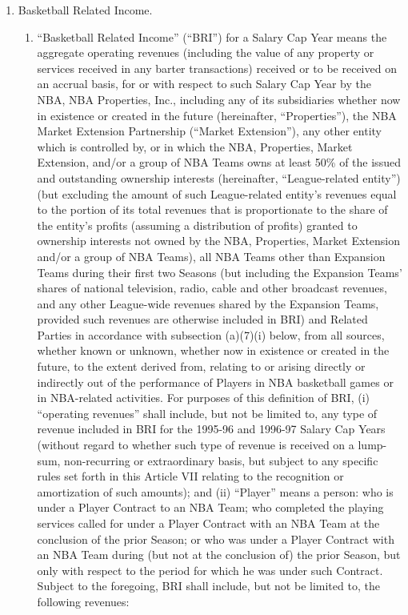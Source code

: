 \documentclass[
]{book}
\providecommand{\tightlist}{%
  \setlength{\itemsep}{0pt}\setlength{\parskip}{0pt}}
\begin{document}
\begin{enumerate}
\def\labelenumi{(\alph{enumi})}
\tightlist
\item
  Basketball Related Income.

  \begin{enumerate}
  \def\labelenumii{(\arabic{enumii})}
  \tightlist
  \item
    ``Basketball Related Income'' (``BRI'') for a Salary Cap Year means the aggregate operating revenues (including the value of any property or services received in any barter transactions) received or to be received on an accrual basis, for or with respect to such Salary Cap Year by the NBA, NBA Properties, Inc., including any of its subsidiaries whether now in existence or created in the future (hereinafter, ``Properties''), the NBA Market Extension Partnership (``Market Extension''), any other entity which is controlled by, or in which the NBA, Properties, Market Extension, and/or a group of NBA Teams owns at least 50\% of the issued and outstanding ownership interests (hereinafter, ``League-related entity'') (but excluding the amount of such League-related entity's revenues equal to the portion of its total revenues that is proportionate to the share of the entity's profits (assuming a distribution of profits) granted to ownership interests not owned by the NBA, Properties, Market Extension and/or a group of NBA Teams), all NBA Teams other than Expansion Teams during their first two Seasons (but including the Expansion Teams' shares of national television, radio, cable and other broadcast revenues, and any other League-wide revenues shared by the Expansion Teams, provided such revenues are otherwise included in BRI) and Related Parties in accordance with subsection (a)(7)(i) below, from all sources, whether known or unknown, whether now in existence or created in the future, to the extent derived from, relating to or arising directly or indirectly out of the performance of Players in NBA basketball games or in NBA-related activities. For purposes of this definition of BRI, (i) ``operating revenues'' shall include, but not be limited to, any type of revenue included in BRI for the 1995-96 and 1996-97 Salary Cap Years (without regard to whether such type of revenue is received on a lump-sum, non-recurring or extraordinary basis, but subject to any specific rules set forth in this Article VII relating to the recognition or amortization of such amounts); and (ii) ``Player'' means a person: who is under a Player Contract to an NBA Team; who completed the playing services called for under a Player Contract with an NBA Team at the conclusion of the prior Season; or who was under a Player Contract with an NBA Team during (but not at the conclusion of) the prior Season, but only with respect to the period for which he was under such Contract. Subject to the foregoing, BRI shall include, but not be limited to, the following revenues:


\end{enumerate}
\end{enumerate}
\end{document}
